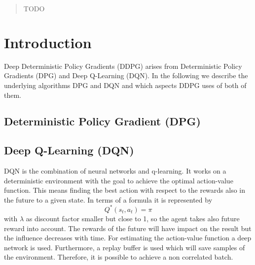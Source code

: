 \date{Received: date / Accepted: date}


\maketitle

\begin{abstract}
TODO
\end{abstract}

\section{Introduction}
\label{sec:intro}

Deep Deterministic Policy Gradients (DDPG) arises from Deterministic Policy 
Gradients (DPG) and Deep Q-Learning (DQN). In the following we describe the 
underlying algorithms DPG and DQN and which aspects DDPG uses of both of them. 
\subsection{Deterministic Policy Gradient (DPG)}
\label{sec:DPG}
\subsection{Deep Q-Learning (DQN)}
\label{sec:DQN}
DQN is the combination of neural networks and q-learning. It works on a 
deterministic environment with the goal to achieve the optimal action-value 
function. This means finding the best action with respect to the rewards also 
in the future to a given state. In terms of a formula it is represented by \[ 
Q^*(s_t, a_t)=\pi\]%
 with $\lambda$ as discount factor smaller but close to 1, 
so the agent takes also future reward into account. The rewards of the future 
will have impact on the result but the influence decreases with time. For 
estimating the action-value function a deep network is used. Furthermore, a 
replay buffer is used which will save samples of the environment. Therefore, it 
is possible to achieve a non correlated batch.

